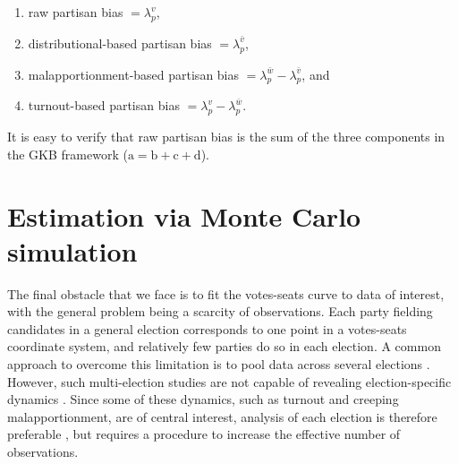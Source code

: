 \documentclass[letter,12pt]{article}
\begin{document}
\begin{enumerate}
\renewcommand{\theenumi}{\alph{enumi}}
\item raw partisan bias $=\lambda_p^v$,
\item distributional-based partisan bias $=\lambda_p^{\bar{v}}$, 
\item malapportionment-based partisan bias $=\lambda_p^{\bar{w}}-\lambda_p^{\bar{v}}$, and
\item turnout-based partisan bias $=\lambda_p^v-\lambda_p^{\bar{w}}$.
\end{enumerate}

\noindent It is easy to verify that raw partisan bias is the sum of the three components in the GKB framework ($\text{a}=\text{b}+\text{c}+\text{d}$). 

\section{Estimation via Monte Carlo simulation}

The final obstacle that we face is to fit the votes-seats curve to data of interest, with the general problem being a scarcity of observations. Each party fielding candidates in a general election corresponds to one point in a votes-seats coordinate system, and relatively few parties do so in each election. A common approach to overcome this limitation is to pool data across several elections \citep[e.g.,][]{marquez2014biasBlog}. However, such multi-election studies are not capable of revealing election-specific dynamics \citep{jackmanMeasuringBias1994}. Since some of these dynamics, such as turnout and creeping malapportionment, are of central interest, analysis of each election is therefore preferable \citep{niemi.fett1986swing}, but requires a procedure to increase the effective number of observations.
\end{document}
